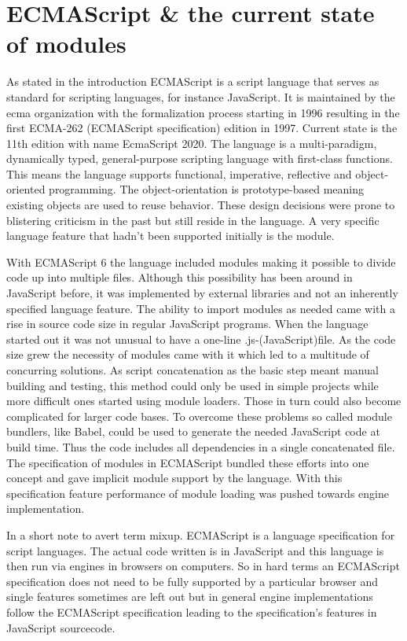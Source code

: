 \section{ECMAScript \& the current state of modules}
As stated in the introduction ECMAScript is a script language that serves as standard for scripting languages, for instance JavaScript. It is maintained by the ecma organization with the formalization process starting in 1996 resulting in the first ECMA-262 (ECMAScript specification) edition in 1997. Current state is the 11th edition with name EcmaScript 2020. \cite{ecma} The language is a multi-paradigm, dynamically typed, general-purpose scripting language with first-class functions. This means the language supports functional, imperative, reflective and object-oriented programming. The object-orientation is prototype-based meaning existing objects are used to reuse behavior. These design decisions were prone to blistering criticism in the past but still reside in the language. \cite{10.1145/3386327} A very specific language feature that hadn't been supported initially is the module.

With ECMAScript 6 the language included modules making it possible to divide code up into multiple files. Although this possibility has been around in JavaScript before, it was implemented by external libraries and not an inherently specified language feature. The ability to import modules as needed came with a rise in source code size in regular JavaScript programs. When the language started out it was not unusual to have a one-line .js-(JavaScript)file. As the code size grew the necessity of modules came with it which led to a multitude of concurring solutions. As script concatenation as the basic step meant manual building and testing, this method could only be used in simple projects while more difficult ones started using module loaders. Those in turn could also become complicated for larger code bases. To overcome these problems so called module bundlers, like Babel, could be used to generate the needed JavaScript code at build time. Thus the code includes all dependencies in a single concatenated file. The specification of modules in ECMAScript bundled these efforts into one concept and gave implicit module support by the language. With this specification feature performance of module loading was pushed towards engine implementation.

In a short note to avert term mixup. ECMAScript is a language specification for script languages. The actual code written is in JavaScript and this language is then run via engines in browsers on computers. So in hard terms an ECMAScript specification does not need to be fully supported by a particular browser and single features sometimes are left out but in general engine implementations follow the ECMAScript specification leading to the specification's features in JavaScript sourcecode.

